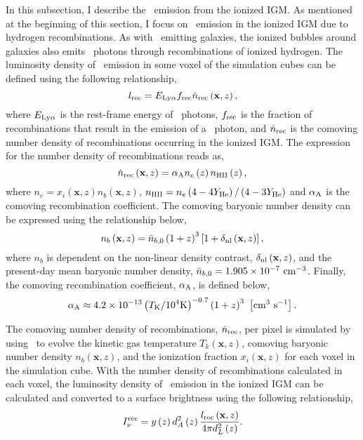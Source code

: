 \label{sec:ionized_igm}

In this subsection, I describe the \lya\ emission from the ionized IGM. As mentioned
at the beginning of this section, I focus on \lya\ emission in the ionized IGM due to hydrogen recombinations.
As with \lya\ emitting galaxies, the ionized bubbles around galaxies also emits \lya\ photons through
recombinations of ionized hydrogen. The luminosity density of \lya\ emission in
some voxel of the simulation cubes can be defined using the following relationship,
\begin{equation}
  l_{\rm rec} = E_{\rm Ly\alpha} f_{\rm rec} \dot{n}_{\rm rec} \left( \textbf{x}, z \right),
\end{equation}
where $E_{\rm Ly\alpha}$ is the rest-frame energy of \lya\ photons, $f_{\rm rec}$ is the
fraction of recombinations that result in the emission of a \lya\ photon, and $\dot{n}_{\rm rec}$
is the comoving number density of recombinations occurring in the ionized IGM. The expression for the
number density of recombinations reads as,
\begin{equation}
  \dot{n}_{\rm rec} \left( \textbf{x}, z \right) = \alpha_{\rm A} n_{e} \left(z \right) n_{\textsc{HII}} \left(z \right),
\end{equation}
where $n_{e} = x_i \left( \textbf{x}, z \right) n_{b} \left( \textbf{x}, z \right)$,
$n_{\textsc{HII}} = n_{e} \left(4 - 4 Y_{\rm He} \right) /  \left(4 - 3 Y_{\rm He} \right)$ and $\alpha_{\rm A}$
is the comoving recombination coefficient. The comoving baryonic number density can be expressed using the
relationship below,
\begin{equation}
  n_{b} \left( \textbf{x}, z \right) = \bar{n}_{b, 0} \left( 1 + z\right)^3 \left[1 + \delta_{\rm nl} \left( \textbf{x}, z\right) \right],
\end{equation}
where $n_{b}$ is dependent on the non-linear density contrast, $\delta_{\rm nl} \left( \textbf{x}, z\right)$, and the
present-day mean baryonic number density, $\bar{n}_{b, 0} = 1.905 \times 10^{-7} \ \rm{cm}^{-3}$. Finally, the
comoving recombination coefficient, $\alpha_{\rm A}$, is defined below,
\begin{equation}
  \alpha_{\rm A} \approx 4.2 \times 10^{-13} \left( T_{\rm K} / 10^4 {\rm K} \right)^{-0.7} \left( 1 + z\right)^3 \ \left[\rm  cm^3 \ s^{-1} \right].
\end{equation}

The comoving number density of recombinations, $\dot{n}_{\rm rec}$, per pixel is simulated
by using \fastsim\ to evolve the kinetic gas temperature $T_k \left( \textbf{x}, z \right)$,
comoving baryonic number density $n_{b} \left( \textbf{x}, z \right)$, and the ionization
fraction $x_{i} \left( \textbf{x}, z \right)$ for each voxel in the simulation cube.
With the number density of recombinations calculated in each voxel, the luminosity
density of \lya\ emission in the ionized IGM can be calculated and converted to
a surface brightness using the following relationship,
\begin{equation}
I_{\nu}^{\rm rec} = y \left(z \right) d_A^2 \left(z \right) \frac{l_{\rm rec} \left( \textbf{x}, z \right)}{4 \pi d_L^2 \left( z \right)}.
\end{equation}

